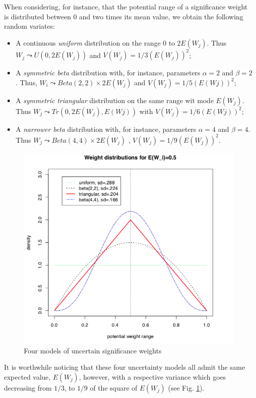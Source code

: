 When considering, for instance, that the potential range of a significance weight is distributed between $0$ and two times its mean value, we obtain the following random variates:
\begin{itemize}
\item A continuous \emph{uniform} distribution on the range $0$ to $2E(W_j)$. Thus $W_j \leadsto U(0, 2E(W_j))$ and $V(W_j) = 1/3(E(W_j))^2$;
\item A \emph{symmetric beta} distribution with, for instance, parameters  $\alpha = 2$ and $\beta = 2$. Thus, $W_i \leadsto Beta(2,2) \times 2E(W_j)$ and $V(W_j) = 1/5(E(Wj))^2$;
\item A \emph{symmetric triangular} distribution on the same range wit mode $E(W_j)$. Thus $W_j \leadsto Tr(0, 2E(W_j), E(Wj))$ with $V(W_j) = 1/6(E(Wj))^2$;
\item A \emph{narrower beta} distribution with, for instance, parameters $\alpha = 4$ and $\beta = 4$. Thus $W_j \leadsto Beta(4,4) \times 2E(W_j)$ , $V(W_j) = 1/9(E(W_j))^2$.
\end{itemize}
\begin{figure}[h]
\includegraphics[width=12cm]{Figures/weightDistributions.png}
\caption{Four models of uncertain significance weights}
\label{fig:18.1}       %
\end{figure}
It is worthwhile noticing that these four uncertainty models all admit the same expected value, $E(W_j)$, however, with a respective variance which goes decreasing from $1/3$, to $1/9$ of the square of $E(W_j)$ (see Fig. \ref{fig:18.1}).

